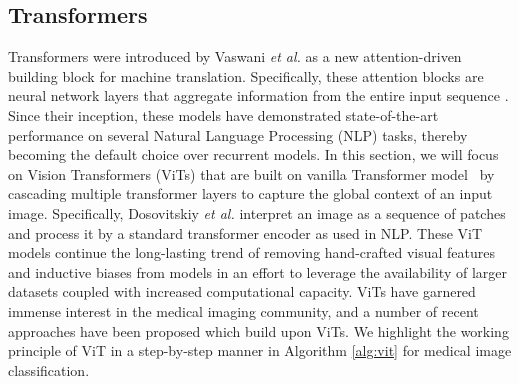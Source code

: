 \documentclass[10pt,journal,compsoc]{IEEEtran}
\begin{document}
\subsection{Transformers}
Transformers were introduced by Vaswani \textit{et al.} \cite{vaswani2017attention} as a new attention-driven building block for machine translation. Specifically, these attention blocks are neural network layers that aggregate information from the entire input sequence \cite{bahdanau2014neural}. Since their inception, these models have demonstrated state-of-the-art performance on several Natural Language Processing (NLP) tasks, thereby becoming the default choice over recurrent models.
In this section, we will focus on Vision Transformers (ViTs) \cite{dosovitskiy2020image} that are built on vanilla Transformer model~\cite{vaswani2017attention} by cascading multiple transformer layers to capture the global context of an input image. Specifically, Dosovitskiy \textit{et al.} \cite{dosovitskiy2020image} interpret an image as a sequence of patches and process it by a standard transformer encoder as used in NLP. These ViT models continue the long-lasting trend of removing hand-crafted visual features and inductive biases from models in an effort to leverage the availability of larger datasets coupled with increased computational capacity. ViTs have garnered immense interest in the medical imaging community, and a number of recent approaches have been proposed which build upon ViTs. We highlight the working principle of ViT in a step-by-step manner in Algorithm \ref{alg:vit} for medical image classification.

\makeatletter
\def\BState{\State\hskip-\ALG@thistlm}
\makeatother
\algnewcommand{}
\algnewcommand{}
\algnewcommand\Input{\item[\algorithmicinput]}%
\algnewcommand\Output{\item[\algorithmicoutput]}%
\end{document}
